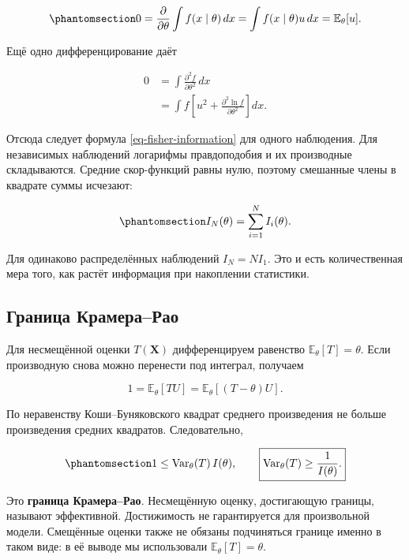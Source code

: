 \documentclass[
  russian,
  11pt,
  a4paper,
  open=any]{scrbook}
\begin{document}
\begin{equation}\protect\phantomsection\label{eq-ch10-score-zero-mean}{
0=\frac{\partial}{\partial\theta}\int f(x\mid\theta)\,dx
=\int f(x\mid\theta)u\,dx
=\mathbb E_\theta[u].
}\end{equation}

Ещё одно дифференцирование даёт

\[
\begin{aligned}
0&=\int\frac{\partial^2f}{\partial\theta^2}\,dx\\
&=\int f\left[u^2+\frac{\partial^2\ln f}{\partial\theta^2}\right]dx.
\end{aligned}
\]

Отсюда следует формула \ref{eq-fisher-information} для одного
наблюдения. Для независимых наблюдений логарифмы правдоподобия и их
производные складываются. Средние скор-функций равны нулю, поэтому
смешанные члены в квадрате суммы исчезают:

\begin{equation}\protect\phantomsection\label{eq-ch10-information-additivity}{
I_N(\theta)=\sum_{i=1}^{N}I_i(\theta).
}\end{equation}

Для одинаково распределённых наблюдений \(I_N=NI_1\). Это и есть
количественная мера того, как растёт информация при накоплении
статистики.

\subsection{Граница
Крамера--Рао}\label{ux433ux440ux430ux43dux438ux446ux430-ux43aux440ux430ux43cux435ux440ux430ux440ux430ux43e}

Для несмещённой оценки \(T(\mathbf X)\) дифференцируем равенство
\(\mathbb E_\theta[T]=\theta\). Если производную снова можно перенести
под интеграл, получаем

\[
1=\mathbb E_\theta[TU]
=\mathbb E_\theta[(T-\theta)U].
\]

По неравенству Коши--Буняковского квадрат среднего произведения не
больше произведения средних квадратов. Следовательно,

\begin{equation}\protect\phantomsection\label{eq-ch10-cramer-rao-bound}{
1\leq\operatorname{Var}_\theta(T)\,I(\theta),
\qquad
\boxed{\operatorname{Var}_\theta(T)\geq\frac1{I(\theta)}.}
}\end{equation}

Это \textbf{граница Крамера--Рао}. Несмещённую оценку, достигающую
границы, называют эффективной. Достижимость не гарантируется для
произвольной модели. Смещённые оценки также не обязаны подчиняться
границе именно в таком виде: в её выводе мы использовали
\(\mathbb E_\theta[T]=\theta\).
\end{document}
